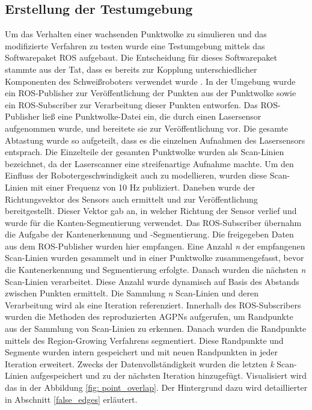 \subsection{Erstellung der Testumgebung}
Um das Verhalten einer wachsenden Punktwolke zu simulieren und das modifizierte Verfahren zu testen wurde eine Testumgebung mittels das Softwarepaket ROS aufgebaut. Die Entscheidung für dieses Softwarepaket stammte aus der Tat, dass es bereits zur Kopplung unterschiedlicher Komponenten des Schweißroboters verwendet wurde \autocite[39]{savla_intelligente_2022}. In der Umgebung wurde ein ROS-Publisher zur Veröffentlichung der Punkten aus der Punktwolke sowie ein ROS-Subscriber zur Verarbeitung dieser Punkten entworfen. Das ROS-Publisher ließ eine Punktwolke-Datei ein, die durch einen Lasersensor aufgenommen wurde, und bereitete sie zur Veröffentlichung vor. Die gesamte Abtastung wurde so aufgeteilt, dass es die einzelnen Aufnahmen des Lasersensors entsprach. Die Einzelteile der gesamten Punktwolke wurden als Scan-Linien bezeichnet, da der Laserscanner eine streifenartige Aufnahme machte. Um den Einfluss der Robotergeschwindigkeit auch zu modellieren, wurden diese Scan-Linien mit einer Frequenz von 10 Hz publiziert. Daneben wurde der Richtungsvektor des Sensors auch ermittelt und zur Veröffentlichung bereitgestellt. Dieser Vektor gab an, in welcher Richtung der Sensor verlief und wurde für die Kanten-Segmentierung verwendet. Das ROS-Subscriber übernahm die Aufgabe der Kantenerkennung und -Segmentierung. Die freigegeben Daten aus dem ROS-Publisher wurden hier empfangen. Eine Anzahl \textit{n} der empfangenen Scan-Linien wurden gesammelt und in einer Punktwolke zusammengefasst, bevor die Kantenerkennung und Segmentierung erfolgte. Danach wurden die nächsten \textit{n} Scan-Linien verarbeitet. Diese Anzahl wurde dynamisch auf Basis des Abstands zwischen Punkten ermittelt. Die Sammlung \textit{n} Scan-Linien und deren Verarbeitung wird als eine Iteration referenziert. Innerhalb des ROS-Subscribers wurden die Methoden des reproduzierten AGPNs aufgerufen, um Randpunkte aus der Sammlung von Scan-Linien zu erkennen. Danach wurden die Randpunkte mittels des Region-Growing Verfahrens segmentiert. Diese Randpunkte und Segmente wurden intern gespeichert und mit neuen Randpunkten in jeder Iteration erweitert. Zwecks der Datenvollständigkeit wurden die letzten \textit{k} Scan-Linien aufgespeichert und zu der nächsten Iteration hinzugefügt. Visualisiert wird das in der Abbildung \ref{fig: point_overlap}. Der Hintergrund dazu wird detaillierter in Abschnitt \ref{false_edges} erläutert.

